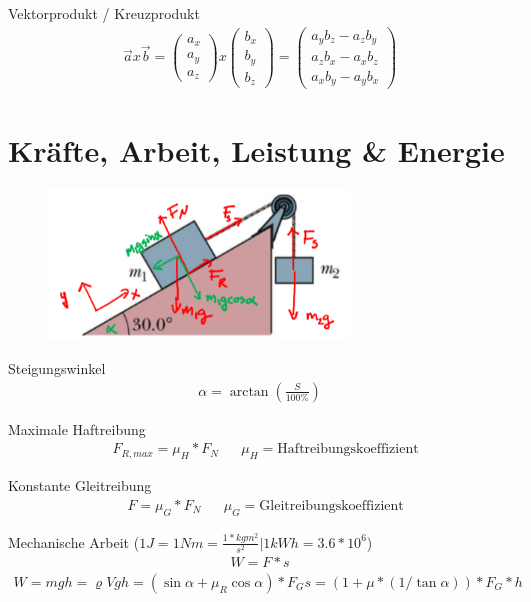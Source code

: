 \documentclass[17pt]{extarticle}
\begin{document}
	Vektorprodukt / Kreuzprodukt
	\begin{align}
		\vec{a} x \vec{b} = 
		\begin{pmatrix} a_x \\ a_y \\ a_z \end{pmatrix}
		x
		\begin{pmatrix} b_x \\ b_y \\ b_z \end{pmatrix}
		=
		\begin{pmatrix} a_y b_z - a_z b_y \\ a_z b_x - a_x b_z \\ a_x b_y - a_y b_x \end{pmatrix}
	\end{align}
	
\section{Kräfte, Arbeit, Leistung \& Energie}
	\begin{figure}[h!]
		\centering
		\includegraphics[width=8cm]{img/Haftreibung.png}
	\end{figure}

	Steigungswinkel
	\begin{align}
		\alpha = \arctan(\frac{S}{100\%}) 
	\end{align}
		
	Maximale Haftreibung
	\begin{align}
		&F_{R,max} = \mu_{H} * F_{N}
		&&\mu_{H} = \text{Haftreibungskoeffizient} 
	\end{align}

	Konstante Gleitreibung
	\begin{align}
		&F = \mu_{G} * F_{N}
		&&\mu_{G} = \text{Gleitreibungskoeffizient}		
	\end{align}

	Mechanische Arbeit \small{($1J = 1Nm = \frac{1*kg m^{2}}{s^{2}} | 1 kWh = 3.6 * 10^6$)}
	\begin{align}
		W = F * s
	\end{align}
	\begin{align}
		W = m g h = \varrho V g h = (\sin \alpha + \mu_R \cos \alpha) * F_G s = (1 + \mu * (1/\tan \alpha)) * F_G * h
	\end{align}
\end{document}
